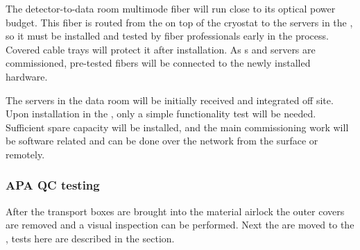 The detector-to-data room multimode fiber will run close to its optical power budget.  This fiber is routed from the  on top of the cryostat to the servers in the , so it must be installed and tested by fiber professionals early in the process.  Covered cable trays will protect it after installation.  As s and servers are commissioned, pre-tested fibers will be connected to the newly installed hardware.

The  servers in the  data room will be initially received and integrated off site.  Upon installation in the , only a simple functionality test will be needed.  Sufficient spare capacity will be installed, and the main commissioning work will be software related and can be done over the network from the surface or remotely.

\subsubsection{APA QC testing}

After the  transport boxes are brought into the material airlock the outer covers are removed and a visual inspection can be performed. Next the  are moved to the , tests here are described in the   section.

